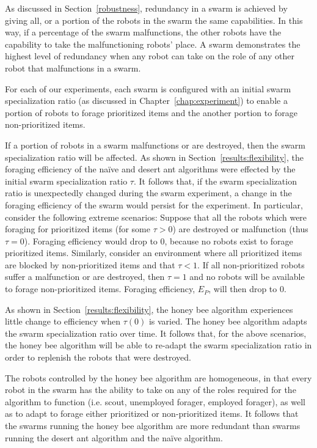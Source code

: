 As discussed in Section~\ref{robustness}, redundancy in a swarm is achieved by giving all, or a portion of the robots in the swarm the same capabilities. In this way, if a percentage of the swarm malfunctions, the other robots have the capability to take the malfunctioning robots' place. A swarm demonstrates the highest level of redundancy when any robot can take on the role of any other robot that malfunctions in a swarm. 

For each of our experiments, each swarm is configured with an initial swarm specialization ratio (as discussed in Chapter~\ref{chap:experiment}) to enable a portion of robots to forage prioritized items and the another portion to forage non-prioritized items. 

If a portion of robots in a swarm malfunctions or are destroyed, then the swarm specialization ratio will be affected. As shown in Section~\ref{results:flexibility}, the foraging efficiency of the na\"ive and desert ant algorithms were effected by the initial swarm specialization ratio $\tau$. It follows that, if the swarm specialization ratio is unexpectedly changed during the swarm experiment, a change in the foraging efficiency of the swarm would persist for the experiment. In particular, consider the following extreme scenarios: Suppose that all the robots which were foraging for prioritized items (for some $\tau > 0$) are destroyed or malfunction (thus $\tau=0$). Foraging efficiency would drop to 0, because no robots exist to forage prioritized items. Similarly, consider an environment where all prioritized items are blocked by non-prioritized items and that $\tau < 1$. If all non-prioritized robots suffer a malfunction or are destroyed, then $\tau=1$ and no robots will be available to forage non-prioritized items. Foraging efficiency, $E_P$, will then drop to 0. 

As shown in Section~\ref{results:flexibility}, the honey bee algorithm experiences little change to efficiency when $\tau(0)$ is varied. The honey bee algorithm adapts the swarm specialization ratio  over time. It follows that, for the above scenarios, the honey bee algorithm will be able to re-adapt the swarm specialization ratio in order to replenish the robots that were destroyed. 

The robots controlled by the honey bee algorithm are homogeneous, in that every robot in the swarm has the ability to take on any of the roles required for the algorithm to function (i.e. scout, unemployed forager, employed forager), as well as to adapt to forage either prioritized or non-prioritized items. It follows that the swarms running the honey bee algorithm are more redundant than swarms running the desert ant algorithm and the na\"ive algorithm.

